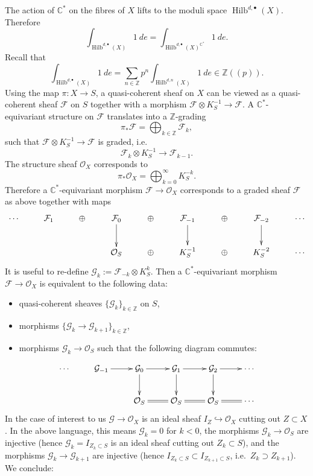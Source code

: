 \documentclass{amsart}
\theoremstyle{definition}
\newcommand{\CC} {\mathbb{C}}          %
\newcommand{\ZZ} {\mathbb{Z}}		%
\renewcommand{\O}{\mathcal{O}}
\newcommand{\Hilb}{\operatorname{Hilb}}
\newcommand{\F}{\mathcal{F}}
\newcommand{\G}{\mathcal{G}}
\begin{document}
The action of $\CC^*$ on the fibres of $X$ lifts to the moduli space $\Hilb^{d,\bullet}(X)$. Therefore
$$
\int_{\Hilb^{d,\bullet}(X)} 1 \ de = \int_{\Hilb^{d,\bullet}(X)^{\CC^*}} 1 \ de.
$$
Recall that 
$$
\int_{\Hilb^{d,\bullet}(X)} 1 \ de = \sum_{n \in \ZZ} p^n \int_{\Hilb^{d,n}(X)} 1 \ de \in \ZZ(\!(p)\!).
$$
Using the map $\pi : X \rightarrow S$, a quasi-coherent sheaf on $X$ can be viewed as a quasi-coherent sheaf $\F$ on $S$ together with a morphism $\F \otimes K_{S}^{-1} \rightarrow \F$. A $\CC^*$-equivariant structure on $\F$ translates into a $\ZZ$-grading
$$
\pi_* \F = \bigoplus_{k \in \ZZ} \F_k,
$$
such that $\F \otimes K_{S}^{-1} \rightarrow \F$ is graded, i.e.
$$
\F_k \otimes K_{S}^{-1} \longrightarrow \F_{k-1}.
$$
The structure sheaf $\O_X$ corresponds to 
$$
\pi_* \O_X = \bigoplus_{k=0}^{\infty} K_{S}^{-k}.
$$
Therefore a $\CC^*$-equivariant morphism $\F \rightarrow \O_X$ corresponds to a graded sheaf $\F$ as above together with maps
\begin{displaymath}
\xymatrix
{
\cdots & \F_1 & \oplus & \F_0 \ar[d] & \oplus & \F_{-1} \ar[d] & \oplus & \F_{-2} \ar[d] & \cdots \\
& & & \O_S & \oplus & K_{S}^{-1} & \oplus & K_{S}^{-2} & \cdots 
}
\end{displaymath}
It is useful to re-define $\G_k := \F_{-k} \otimes K_{S}^{k}$. Then a $\CC^*$-equivariant morphism $\F \rightarrow \O_X$ is equivalent to the following data:
\begin{itemize}
\item quasi-coherent sheaves $\{\G_k\}_{k \in \ZZ}$ on $S$,
\item morphisms $\{\G_k \rightarrow \G_{k+1}\}_{k \in \ZZ}$,
\item morphisms $\G_k \rightarrow \O_S$ such that the following diagram commutes:
\end{itemize}
\begin{displaymath}
\xymatrix
{
\cdots & \G_{-1} \ar[r] & \G_0 \ar[r] \ar[d] & \G_{1} \ar[r] \ar[d] & \G_{2} \ar[r] \ar[d] & \cdots \\
& & \O_S \ar@{=}[r]& \O_S \ar@{=}[r] & \O_S \ar@{=}[r] & \cdots 
}
\end{displaymath}
In the case of interest to us $\G \rightarrow \O_X$ is an ideal sheaf $I_Z \hookrightarrow \O_X$ cutting out $Z \subset X$. In the above language, this means $\G_k = 0$ for $k<0$, the morphisms $\G_k \rightarrow \O_S$ are injective (hence $\G_k = I_{Z_k \subset S}$ is an ideal sheaf cutting out $Z_k \subset S$), and the morphisms $\G_k \rightarrow \G_{k+1}$ are injective (hence $I_{Z_k \subset S} \subset I_{Z_{k+1} \subset S}$, i.e.~$Z_{k} \supset Z_{k+1}$). We conclude:
\end{document}
